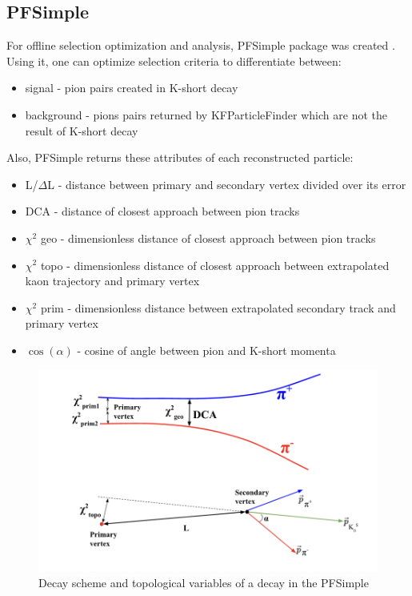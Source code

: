 \subsection{PFSimple}
For offline selection optimization and analysis, PFSimple package was created \cite{lubynets}. Using it, one can optimize selection criteria to differentiate between:
\begin{itemize}
    \item signal - pion pairs created in K-short decay
    \item background - pions pairs returned by KFParticleFinder which are not the result of K-short decay
\end{itemize}
Also, PFSimple returns these attributes of each reconstructed particle:
\begin{itemize}
    \item L/$\Delta$L - distance between primary and secondary vertex divided over its error
    \item DCA - distance of closest approach between pion tracks
    \item $\chi^2$ geo - dimensionless distance of closest approach between pion tracks
    \item $\chi^2$ topo - dimensionless distance of closest approach between extrapolated kaon trajectory and primary vertex
    \item $\chi^2$ prim - dimensionless distance between extrapolated secondary track and primary vertex
    \item $\cos(\alpha)$ - cosine of angle between pion and K-short momenta
\end{itemize}
\begin{figure}[H]
    \centering
    \includegraphics[width=.9\textwidth]{img/pfsimple_variables.png}
    \caption{Decay scheme and topological variables of a \PKshort decay in the PFSimple}
    \label{cbm_setup}
\end{figure}
